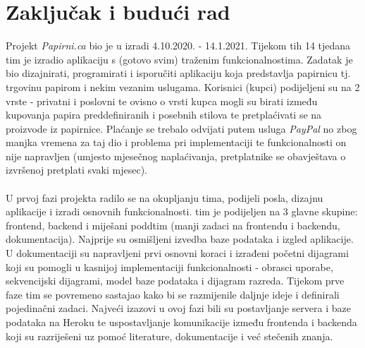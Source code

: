 \chapter{Zaključak i budući rad}
		
		
		
		\normalsize
		Projekt \textit{Papirni.ca} bio je u izradi 4.10.2020. - 14.1.2021. Tijekom tih 14 tjedana tim je izradio aplikaciju s (gotovo svim) traženim funkcionalnostima.
		Zadatak je bio dizajnirati, programirati i isporučiti aplikaciju koja predstavlja papirnicu tj. trgovinu papirom i nekim vezanim uslugama. Korisnici (kupci) podijeljeni su na 2 vrste - privatni i poslovni te ovisno o vrsti kupca mogli su birati između kupovanja papira preddefiniranih i posebnih stilova te pretplaćivati se na proizvode iz papirnice. Plaćanje se trebalo odvijati putem usluga \textit{PayPal} no zbog manjka vremena za taj dio i problema pri implementaciji te funkcionalnosti on nije napravljen (umjesto mjesečnog naplaćivanja, pretplatnike se obavještava o izvršenoj pretplati svaki mjesec).
		\\
		\\
		U prvoj fazi projekta radilo se na okupljanju tima, podijeli posla, dizajnu aplikacije i izradi osnovnih funkcionalnosti. tim je podijeljen na 3 glavne skupine: frontend, backend i miješani poddtim (manji zadaci na frontendu i backendu, dokumentacija). Najprije su osmišljeni izvedba baze podataka i izgled aplikacije. U dokumentaciji su napravljeni prvi osnovni koraci i izrađeni početni dijagrami koji su pomogli u kasnijoj implementaciji funkcionalnosti - obrasci uporabe, sekvencijski dijagrami, model baze
		podataka i dijagram razreda. Tijekom prve faze tim se povremeno sastajao kako bi se razmijenile daljnje ideje i definirali pojedinačni zadaci.  Najveći izazovi u ovoj fazi bili su postavljanje servera i baze podataka na Heroku te uspostavljanje komunikacije između frontenda i backenda koji su razriješeni uz pomoć literature, dokumentacije i već stečenih znanja.
